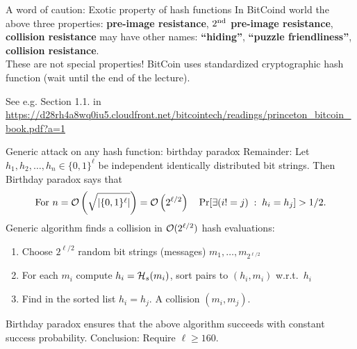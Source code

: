 \documentclass[usenames,dvipsnames, 9pt]{beamer}
\begin{document}
\begin{frame}{A word of caution: Exotic property of hash functions}
	\LARGE
	In BitCoind world the above three properties: \textbf{pre-image resistance}, \textbf{$2^{\mathrm{nd}}$ pre-image resistance}, \textbf{collision resistance} may have other names: \textbf{``hiding''}, \textbf{``puzzle friendliness''}, \textbf{collision resistance}.\\[10pt]
	
	These are not special properties! BitCoin uses standardized cryptographic hash function (wait until the end of the lecture).
	
	\vfill
	See e.g. Section 1.1. in \url{https://d28rh4a8wq0iu5.cloudfront.net/bitcointech/readings/princeton_bitcoin_book.pdf?a=1}
\end{frame}

\begin{frame}{Generic attack on any hash function: birthday paradox}
\large 
	Remainder: Let $h_1, h_2, \ldots, h_n \in \{0,1\}^\ell$ be independent identically distributed bit strings. Then Birthday paradox says that
	\[
	\text{For } n = \mathcal{O}\left (\sqrt{ \left\lvert \{0,1\}^\ell \right\rvert} \right) = \mathcal{O}\left( 2^{\ell/2} \right) \quad  \Pr[\exists (i != j) \; : \; h_i = h_j] > 1/2.
	\]
	\pause
	Generic algorithm finds a collision in {\color{Orange} $\mathcal{O}(2^{\ell/2})$ } hash evaluations: \\
	\begin{enumerate}
		\itemsep 10pt
		\item Choose $ 2^{\ell/2}$ random bit strings (messages) $m_1, \ldots, m_{2^{\ell/2}}$ 
		\item  For each $m_i$ compute $h_i = \mathcal{H}_s(m_i)$, sort pairs to $(h_i, m_i)$ w.r.t.\ $h_i$
		\item  Find in the sorted list $h_i = h_j$. A collision $(m_i, m_j)$.
	\end{enumerate}			
	 Birthday paradox ensures that the above algorithm succeeds with constant success probability. 
	 \vfill
	\LARGE
	{\color{Orange} Conclusion:} Require  $\ell \geq 160$.
\end{frame}
\end{document}
